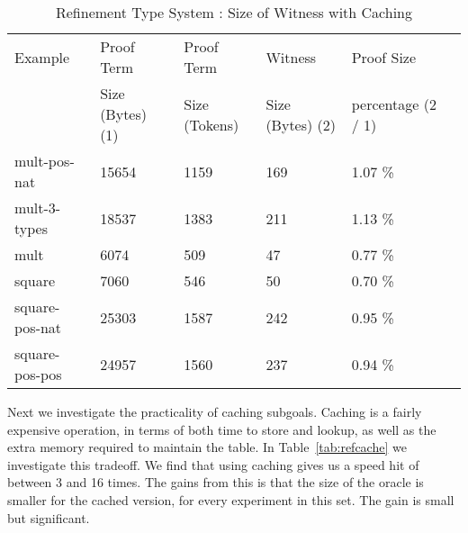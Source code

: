 \documentclass{llncs}
\begin{document}
\begin{table*}[htbp]
\begin{center}
\begin{small}
\begin{tabular}{|l|l|l|l|l|l|}
\hline
Example & Proof Term & Proof Term & Witness & Proof Size\\
& Size (Bytes) (1) & Size (Tokens) & Size (Bytes) (2) & percentage (2 / 1)\\
\hline
mult-pos-nat & 15654 & 1159 & 169 & 1.07 \%\\
mult-3-types & 18537 & 1383 & 211 & 1.13 \%\\
mult & 6074 & 509 & 47 & 0.77 \%\\
square & 7060 & 546 & 50 & 0.70 \%\\
square-pos-nat & 25303 & 1587 & 242 & 0.95 \%\\
square-pos-pos & 24957 & 1560 & 237 & 0.94 \%\\
\hline
\end{tabular}
\end{small}
\end{center}
\caption{\label{tab:refsizes} Refinement Type System : 
Size of Witness with Caching}
\end{table*}

Next we investigate the practicality of caching subgoals. Caching is 
a fairly expensive operation, in terms of both time to store and lookup, 
as well as the extra memory required to maintain the table. In 
Table~\ref{tab:refcache} we investigate this tradeoff. We find that
using caching gives us a speed hit of between 3 and 16 times. The 
gains from this is that the size of the oracle is smaller for the
cached version, for every experiment in this set. The gain is small
but significant.
\end{document}
